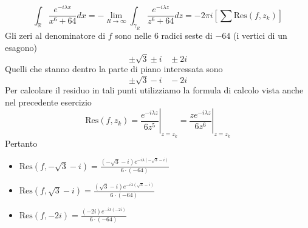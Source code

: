 \begin{equation*}
\int _{\mathbb{R}}\frac{e^{-i\lambda x}}{x^{6} +64} dx=-\lim\limits _{R\rightarrow \infty }\int _{\gamma _{R}}\frac{e^{-i\lambda z}}{z^{6} +64} dz=-2\pi i\left[\sum \mathrm{Res}\left( f,z_{k}\right)\right]
\end{equation*}
Gli zeri al denominatore di $f$ sono nelle $6$ radici seste di $-64$ (i vertici di un esagono)
\begin{equation*}
\pm \sqrt{3} \pm i\ \ \ \ \pm 2i
\end{equation*}
Quelli che stanno dentro la parte di piano interessata sono
\begin{equation*}
\pm \sqrt{3} -i\ \ \ \ -2i
\end{equation*}
Per calcolare il residuo in tali punti utilizziamo la formula di calcolo vista anche nel precedente esercizio
\begin{equation*}
\mathrm{Res}\left( f,z_{k}\right) =\left. \frac{e^{-i\lambda z}}{6z^{5}}\right| _{z=z_{k}} =\left. \frac{ze^{-i\lambda z}}{6z^{6}}\right| _{z=z_{k}}
\end{equation*}
Pertanto
\begin{itemize}
\item $\mathrm{Res}\left( f,-\sqrt{3} -i\right) =\frac{\left( -\sqrt{3} -i\right) e^{-i\lambda \left( -\sqrt{3} -i\right)}}{6\cdotp \left( -64\right)}$
\item $\mathrm{Res}\left( f,\sqrt{3} -i\right) =\frac{\left(\sqrt{3} -i\right) e^{-i\lambda \left(\sqrt{3} -i\right)}}{6\cdotp \left( -64\right)}$
\item $\mathrm{Res}\left( f,-2i\right) =\frac{\left( -2i\right) e^{-i\lambda \left( -2i\right)}}{6\cdotp \left( -64\right)}$
\end{itemize}

